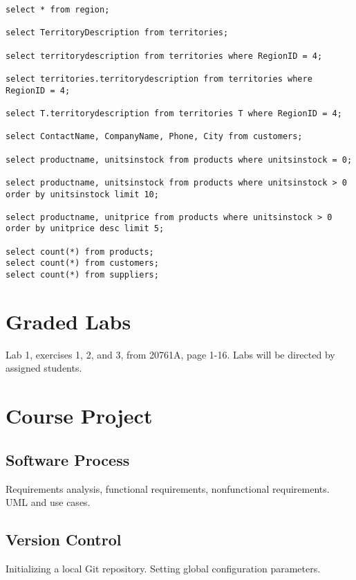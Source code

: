 \documentclass{article}
\begin{document}
        \begin{lstlisting}
select * from region;

select TerritoryDescription from territories;

select territorydescription from territories where RegionID = 4;

select territories.territorydescription from territories where RegionID = 4;

select T.territorydescription from territories T where RegionID = 4;

select ContactName, CompanyName, Phone, City from customers;

select productname, unitsinstock from products where unitsinstock = 0;

select productname, unitsinstock from products where unitsinstock > 0 order by unitsinstock limit 10;

select productname, unitprice from products where unitsinstock > 0 order by unitprice desc limit 5;

select count(*) from products;
select count(*) from customers;
select count(*) from suppliers;
        \end{lstlisting}


    \section{Graded Labs}

Lab 1, exercises 1, 2, and 3, from 20761A, page 1-16. Labs will be directed by assigned students.

    \section{Course Project}


        \subsection{Software Process}

        Requirements analysis, functional requirements, nonfunctional requirements. UML and use cases.
        
        \subsection{Version Control}

        Initializing a local Git repository. Setting global configuration parameters.
\end{document}

